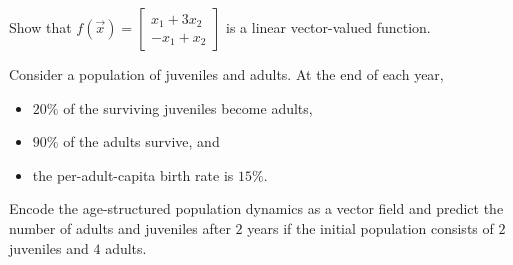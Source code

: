 \documentclass[../main.tex]{subfiles}
\begin{document}
\begin{example}
  Show that \(f(\vec{x}) = \begin{bmatrix} x_{1} + 3x_{2} \\ -x_{1} + x_{2} \end{bmatrix}\) is a linear vector-valued function. 
\end{example}

\begin{example}
  Consider a population of juveniles and adults.  At the end of each year, 
  \begin{itemize}
    \item \(20\%\) of the surviving juveniles become adults, 
    \item \(90\%\) of the adults survive, and
    \item the per-adult-capita birth rate is \(15\%\). 
  \end{itemize}

  Encode the age-structured population dynamics as a vector field and predict the number of adults and juveniles after \(2\) years if the initial population consists of \(2\) juveniles and \(4\) adults.

\end{example}
\end{document}

